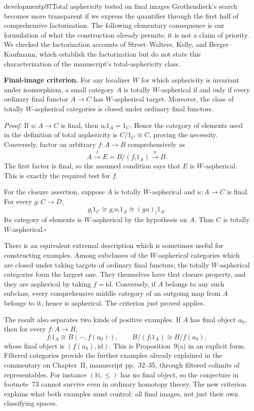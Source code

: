 \begin{dcomment}{development}{p97}{Total asphericity tested on final images}
Grothendieck's search becomes more transparent if we express the quantifier through the first half of comprehensive factorization. The following elementary consequence is our formulation of what the construction already permits; it is not a claim of priority. We checked the factorization accounts of Street--Walters, Kelly, and Berger--Kaufmann, which establish the factorization but do not state this characterization of the manuscript's total-asphericity class.

\noindent\textbf{Final-image criterion.}\ours\quad
For any localizer $W$ for which asphericity is invariant under isomorphism, a small category $A$ is totally $W$-aspherical if and only if every ordinary final functor $A\to C$ has $W$-aspherical target. Moreover, the class of totally $W$-aspherical categories is closed under ordinary final functors.

\emph{Proof.} If $u:A\to C$ is final, then $u_!1_A=1_C$. Hence the category of elements used in the definition of total asphericity is $C/1_C\cong C$, proving the necessity. Conversely, factor an arbitrary $f:A\to B$ comprehensively as
\[
A\xrightarrow{j}E=B/(f_!1_A)\xrightarrow{\pi}B.
\]
The first factor is final, so the assumed condition says that $E$ is $W$-aspherical. This is exactly the required test for $f$.

For the closure assertion, suppose $A$ is totally $W$-aspherical and $u:A\to C$ is final. For every $g:C\to D$,
\[
g_!1_C\cong g_!u_!1_A\cong(gu)_!1_A.
\]
Its category of elements is $W$-aspherical by the hypothesis on $A$. Thus $C$ is totally $W$-aspherical.\hfill$\square$

There is an equivalent extremal description which is sometimes useful for constructing examples. Among subclasses of the $W$-aspherical categories which are closed under taking targets of ordinary final functors, the totally $W$-aspherical categories form the largest one. They themselves have that closure property, and they are aspherical by taking $f=\mathrm{id}$. Conversely, if $A$ belongs to any such subclass, every comprehensive middle category of an outgoing map from $A$ belongs to it, hence is aspherical. The criterion just proved applies.

The result also separates two kinds of positive examples. If $A$ has final object $a_0$, then for every $f:A\to B$,
\[
f_!1_A\cong B(-,f(a_0)),\qquad
B/(f_!1_A)\cong B/f(a_0),
\]
whose final object is $(f(a_0),\mathrm{id})$. This is Proposition~9(a) in an explicit form. Filtered categories provide the further examples already explained in the commentary on Chapter~II, manuscript pp.~32--35, through filtered colimits of representables. For instance $(\mathbb N,\leq)$ has no final object, so the conjecture in footnote~73 cannot survive even in ordinary homotopy theory. The new criterion explains what both examples must control: all final images, not just their own classifying spaces.
\end{dcomment}

